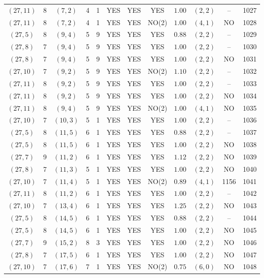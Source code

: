 \begin{longtable}{|c|c|c|c|c|c|c|c|c|c|c|c|}
$(27,11)$ & 8 & $(7,2)$ & 4 & 1 & YES & YES & YES & $1.00$ & $(2,2)$ & -- & 1027\\
$(27,11)$ & 8 & $(7,2)$ & 4 & 1 & YES & YES & NO(2) & $1.00$ & $(4,1)$ & NO & 1028\\
$(27,5)$ & 8 & $(9,4)$ & 5 & 9 & YES & YES & YES & $0.88$ & $(2,2)$ & -- & 1029\\
$(27,8)$ & 7 & $(9,4)$ & 5 & 9 & YES & YES & YES & $1.00$ & $(2,2)$ & -- & 1030\\
$(27,8)$ & 7 & $(9,4)$ & 5 & 9 & YES & YES & YES & $1.00$ & $(2,2)$ & NO & 1031\\
$(27,10)$ & 7 & $(9,2)$ & 5 & 9 & YES & YES & NO(2) & $1.10$ & $(2,2)$ & -- & 1032\\
$(27,11)$ & 8 & $(9,2)$ & 5 & 9 & YES & YES & YES & $1.00$ & $(2,2)$ & -- & 1033\\
$(27,11)$ & 8 & $(9,2)$ & 5 & 9 & YES & YES & YES & $1.00$ & $(2,2)$ & NO & 1034\\
$(27,11)$ & 8 & $(9,4)$ & 5 & 9 & YES & YES & NO(2) & $1.00$ & $(4,1)$ & NO & 1035\\
$(27,10)$ & 7 & $(10,3)$ & 5 & 1 & YES & YES & YES & $1.00$ & $(2,2)$ & -- & 1036\\
$(27,5)$ & 8 & $(11,5)$ & 6 & 1 & YES & YES & YES & $0.88$ & $(2,2)$ & -- & 1037\\
$(27,5)$ & 8 & $(11,5)$ & 6 & 1 & YES & YES & YES & $1.00$ & $(2,2)$ & NO & 1038\\
$(27,7)$ & 9 & $(11,2)$ & 6 & 1 & YES & YES & YES & $1.12$ & $(2,2)$ & NO & 1039\\
$(27,8)$ & 7 & $(11,3)$ & 5 & 1 & YES & YES & YES & $1.00$ & $(2,2)$ & NO & 1040\\
$(27,10)$ & 7 & $(11,4)$ & 5 & 1 & YES & YES & NO(2) & $0.89$ & $(4,1)$ & 1156 & 1041\\
$(27,11)$ & 8 & $(11,2)$ & 6 & 1 & YES & YES & YES & $1.00$ & $(2,2)$ & -- & 1042\\
$(27,10)$ & 7 & $(13,4)$ & 6 & 1 & YES & YES & YES & $1.25$ & $(2,2)$ & NO & 1043\\
$(27,5)$ & 8 & $(14,5)$ & 6 & 1 & YES & YES & YES & $0.88$ & $(2,2)$ & -- & 1044\\
$(27,5)$ & 8 & $(14,5)$ & 6 & 1 & YES & YES & YES & $1.00$ & $(2,2)$ & NO & 1045\\
$(27,7)$ & 9 & $(15,2)$ & 8 & 3 & YES & YES & YES & $1.00$ & $(2,2)$ & NO & 1046\\
$(27,8)$ & 7 & $(17,5)$ & 6 & 1 & YES & YES & YES & $1.00$ & $(2,2)$ & NO & 1047\\
$(27,10)$ & 7 & $(17,6)$ & 7 & 1 & YES & YES & NO(2) & $0.75$ & $(6,0)$ & NO & 1048\\

\end{longtable}
